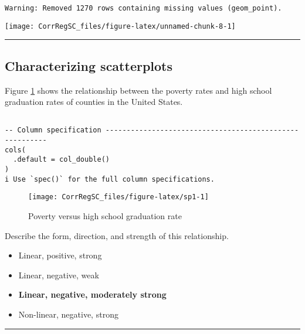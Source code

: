 \documentclass[
]{book}
\begin{document}
\begin{verbatim}
Warning: Removed 1270 rows containing missing values (geom_point).
\end{verbatim}

\begin{center}\texttt{[image: CorrRegSC\_files/figure-latex/unnamed-chunk-8-1]} \end{center}

\begin{center}\rule{0.5\linewidth}{0.5pt}\end{center}

\hypertarget{characterizing-scatterplots}{%
\subsection*{Characterizing scatterplots}\label{characterizing-scatterplots}}

Figure \ref{fig:sp1} shows the relationship between the poverty rates and high school graduation rates of counties in the United States.

\begin{verbatim}

-- Column specification --------------------------------------------------------
cols(
  .default = col_double()
)
i Use `spec()` for the full column specifications.
\end{verbatim}

\begin{figure}

{\centering \texttt{[image: CorrRegSC\_files/figure-latex/sp1-1]} 

}

\caption{Poverty versus high school graduation rate}\label{fig:sp1}
\end{figure}

Describe the form, direction, and strength of this relationship.

\begin{itemize}
\item
  Linear, positive, strong
\item
  Linear, negative, weak
\item
  \textbf{Linear, negative, moderately strong}
\item
  Non-linear, negative, strong
\end{itemize}

\begin{center}\rule{0.5\linewidth}{0.5pt}\end{center}
\end{document}
